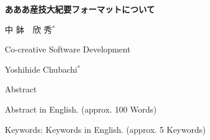 \documentclass[a4j,9pt,twoside]{jarticle}
\begin{document}
\renewcommand{\thefootnote}{\fnsymbol{footnote}}{}

\vspace{-0.78cm}

\begin{center}
\vspace{0.5cm}

{\LARGE \bf 
あああ産技大紀要フォーマットについて
}

\vspace{.6cm}

{\large 
中 鉢　欣 秀$^{*}$
}

\vspace{.6cm}

{\Large 
Co-creative Software Development
}\\

\vspace{.4cm}

{\large 
Yoshihide Chubachi$^{*}$
}

\vspace{.4cm}
{\large Abstract}
\end{center}

\vspace{-2ex}
\noindent
{\normalsize
Abstract in English. (approx. 100 Words) 
\vspace{.3cm}

\noindent
Keywords: 
Keywords in English. (approx. 5 Keywords)
}

\vspace{.5cm}
\end{document}
